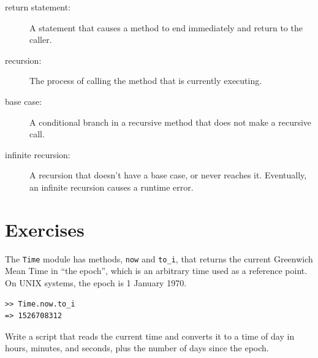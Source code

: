 \documentclass[10pt]{book}
\begin{document}
\begin{description}
\item[return statement:] A statement that causes a method to
end immediately and return to the caller.

\item[recursion:]  The process of calling the method that is
currently executing.

\item[base case:]  A conditional branch in a
recursive method that does not make a recursive call.

\item[infinite recursion:]  A recursion that doesn't have a
base case, or never reaches it.  Eventually, an infinite recursion
causes a runtime error.

\end{description}

\section{Exercises}

\begin{exercise}

    The {\tt Time} module has methods, {\tt now} and {\tt to\_i}, that
returns the current Greenwich Mean Time in ``the epoch'', which is
an arbitrary time used as a reference point.  On UNIX systems, the
epoch is 1 January 1970.

\begin{verbatim}
>> Time.now.to_i
=> 1526708312
\end{verbatim}

Write a script that reads the current time and converts it to
a time of day in hours, minutes, and seconds, plus the number of
days since the epoch.

\end{exercise}
\end{document}

